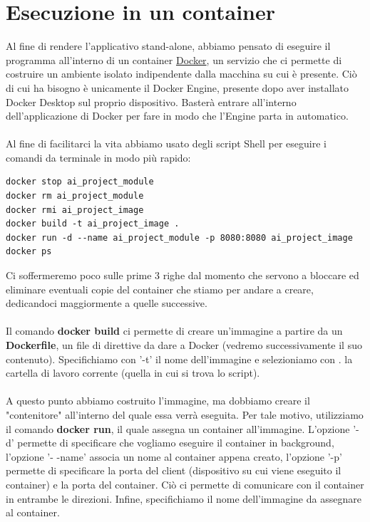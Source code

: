 \documentclass{article}
\begin{document}
\section{Esecuzione in un container}
Al fine di rendere l'applicativo stand-alone, abbiamo pensato di eseguire il programma all'interno di un container \href{https://www.docker.com/}{Docker}, un servizio che ci permette di costruire un ambiente isolato indipendente dalla macchina su cui è presente. Ciò di cui ha bisogno è unicamente il Docker Engine, presente dopo aver installato Docker Desktop sul proprio dispositivo. Basterà entrare all'interno dell'applicazione di Docker per fare in modo che l'Engine parta in automatico. \\ \\
Al fine di facilitarci la vita abbiamo usato degli script Shell per eseguire i comandi da terminale in modo più rapido:
\begin{verbatim}
docker stop ai_project_module
docker rm ai_project_module
docker rmi ai_project_image
docker build -t ai_project_image .
docker run -d --name ai_project_module -p 8080:8080 ai_project_image
docker ps
\end{verbatim}
Ci soffermeremo poco sulle prime 3 righe dal momento che servono a bloccare ed eliminare eventuali copie del container che stiamo per andare a creare, dedicandoci maggiormente a quelle successive. \\\\
Il comando \textbf{docker build} ci permette di creare un'immagine a partire da un \textbf{Dockerfile}, un file di direttive da dare a Docker (vedremo successivamente il suo contenuto). Specifichiamo con '-t' il nome dell'immagine e selezioniamo con . la cartella di lavoro corrente (quella in cui si trova lo script).\\\\
A questo punto abbiamo costruito l'immagine, ma dobbiamo creare il "contenitore" all'interno del quale essa verrà eseguita. Per tale motivo, utilizziamo il comando \textbf{docker run}, il quale assegna un container all'immagine. L'opzione '-d' permette di specificare che vogliamo eseguire il container in background, l'opzione '- -name' associa un nome al container appena creato, l'opzione '-p' permette di specificare la porta del client (dispositivo su cui viene eseguito il container) e la porta del container. Ciò ci permette di comunicare con il container in entrambe le direzioni. Infine, specifichiamo il nome dell'immagine da assegnare al container.\\ \\
\end{document}
